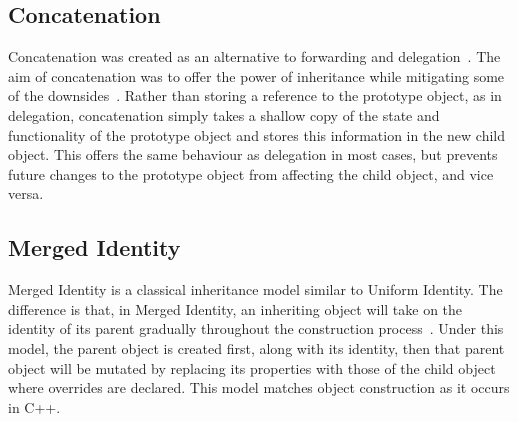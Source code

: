 \subsection{Concatenation}
Concatenation was created as an alternative to forwarding and delegation~\cite{InheritanceWithoutClasses}. The aim of concatenation was to offer the power of inheritance while mitigating some of the downsides~\cite{Concatenation}. Rather than storing a reference to the prototype object, as in delegation, concatenation simply takes a shallow copy of the state and functionality of the prototype object and stores this information in the new child object. This offers the same behaviour as delegation in most cases, but prevents future changes to the prototype object from affecting the child object, and vice versa.

\subsection{Merged Identity}
Merged Identity is a classical inheritance model similar to Uniform Identity. The difference is that, in Merged Identity, an inheriting object will take on the identity of its parent gradually throughout the construction process~\cite{InheritanceWithoutClasses}. Under this model, the parent object is created first, along with its identity, then that parent object will be mutated by replacing its properties with those of the child object where overrides are declared. This model matches object construction as it occurs in C++.

